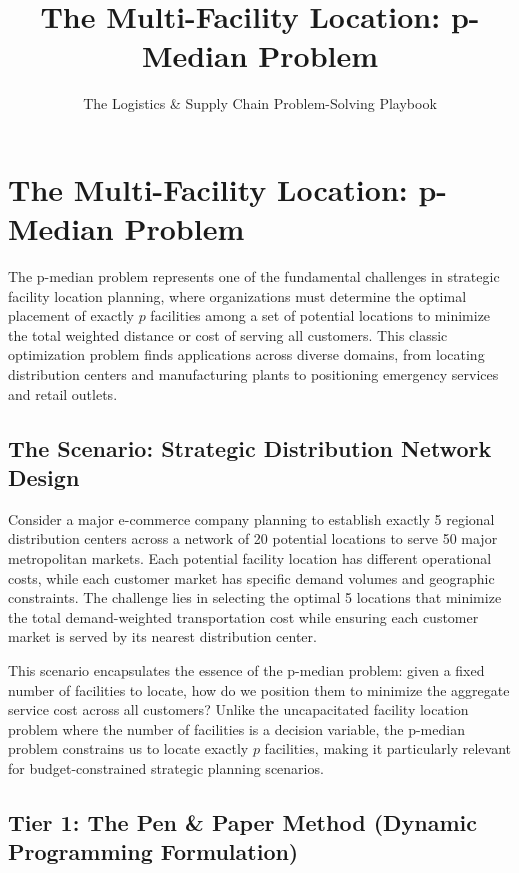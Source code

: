 \documentclass{article}
\title{The Multi-Facility Location: p-Median Problem}
\author{The Logistics \& Supply Chain Problem-Solving Playbook}
\date{}
\begin{document}
\maketitle

\section{The Multi-Facility Location: p-Median Problem}

The p-median problem represents one of the fundamental challenges in strategic facility location planning, where organizations must determine the optimal placement of exactly \(p\) facilities among a set of potential locations to minimize the total weighted distance or cost of serving all customers. This classic optimization problem finds applications across diverse domains, from locating distribution centers and manufacturing plants to positioning emergency services and retail outlets.

\subsection{The Scenario: Strategic Distribution Network Design}

Consider a major e-commerce company planning to establish exactly 5 regional distribution centers across a network of 20 potential locations to serve 50 major metropolitan markets. Each potential facility location has different operational costs, while each customer market has specific demand volumes and geographic constraints. The challenge lies in selecting the optimal 5 locations that minimize the total demand-weighted transportation cost while ensuring each customer market is served by its nearest distribution center.

This scenario encapsulates the essence of the p-median problem: given a fixed number of facilities to locate, how do we position them to minimize the aggregate service cost across all customers? Unlike the uncapacitated facility location problem where the number of facilities is a decision variable, the p-median problem constrains us to locate exactly \(p\) facilities, making it particularly relevant for budget-constrained strategic planning scenarios.

\subsection{Tier 1: The Pen \& Paper Method (Dynamic Programming Formulation)}
\end{document}
